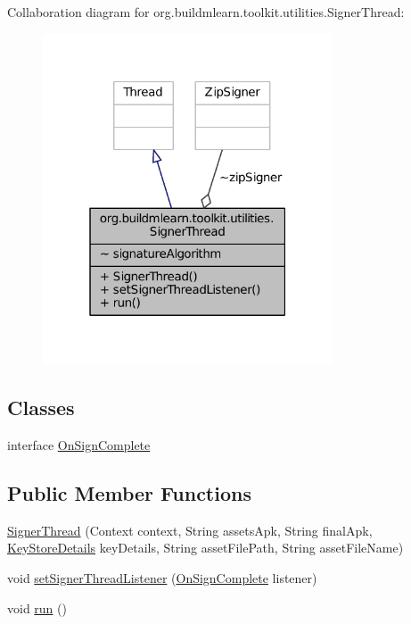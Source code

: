 Collaboration diagram for org.\-buildmlearn.\-toolkit.\-utilities.\-Signer\-Thread\-:
\nopagebreak
\begin{figure}[H]
\begin{center}
\leavevmode
\includegraphics[width=244pt]{dd/d23/classorg_1_1buildmlearn_1_1toolkit_1_1utilities_1_1SignerThread__coll__graph}
\end{center}
\end{figure}
\subsection*{Classes}
\begin{DoxyCompactItemize}
\item 
interface \hyperlink{interfaceorg_1_1buildmlearn_1_1toolkit_1_1utilities_1_1SignerThread_1_1OnSignComplete}{On\-Sign\-Complete}
\end{DoxyCompactItemize}
\subsection*{Public Member Functions}
\begin{DoxyCompactItemize}
\item 
\hyperlink{classorg_1_1buildmlearn_1_1toolkit_1_1utilities_1_1SignerThread_a5a37aaaeb632085cc262eb0376f4cabb}{Signer\-Thread} (Context context, String assets\-Apk, String final\-Apk, \hyperlink{classorg_1_1buildmlearn_1_1toolkit_1_1model_1_1KeyStoreDetails}{Key\-Store\-Details} key\-Details, String asset\-File\-Path, String asset\-File\-Name)
\item 
void \hyperlink{classorg_1_1buildmlearn_1_1toolkit_1_1utilities_1_1SignerThread_a2f75999b55a36de5421b6563677eb75a}{set\-Signer\-Thread\-Listener} (\hyperlink{interfaceorg_1_1buildmlearn_1_1toolkit_1_1utilities_1_1SignerThread_1_1OnSignComplete}{On\-Sign\-Complete} listener)
\item 
void \hyperlink{classorg_1_1buildmlearn_1_1toolkit_1_1utilities_1_1SignerThread_ab03f540249e80693f090c9b30c692d17}{run} ()
\end{DoxyCompactItemize}


